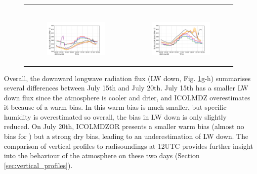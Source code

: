 \begin{figure}[hbtp]
\begin{tabular}{cc}
\begin{subfigure}[t]{0.5\textwidth}
        \end{subfigure} \\
        \begin{subfigure}[t]{0.5\textwidth}
            \caption{}
            \includegraphics[width=\textwidth]{images/chap5/IOP_TS/TS_2021-07-15_cendrosa_LWdnSFC.png}
        \end{subfigure} &
        \begin{subfigure}[t]{0.5\textwidth}
            \caption{}
            \includegraphics[width=\textwidth]{images/chap5/IOP_TS/TS_2021-07-20_cendrosa_LWdnSFC.png}
        \end{subfigure}
    \end{tabular}
    \caption{}
    \label{fig:iop_days_TS_energy}
\end{figure}

Overall, the downward longwave radiation flux (LW down, Fig. \ref{fig:iop_days_TS_energy}g-h) summarises several differences between July 15th and July 20th. July 15th has a smaller LW down flux since the atmosphere is cooler and drier, and ICOLMDZ overestimates it because of a warm bias. In \irrboost this warm bias is much smaller, but specific humidity is overestimated so overall, the bias in LW down is only slightly reduced. 
On July 20th, ICOLMDZOR presents a smaller warm bias (almost no bias for \irrboost) but a strong dry bias, leading to an underestimation of LW down. The comparison of vertical profiles to radisoundings at 12UTC  provides further insight into the behaviour of the atmosphere on these two days (Section \ref{sec:vertical_profiles}).

